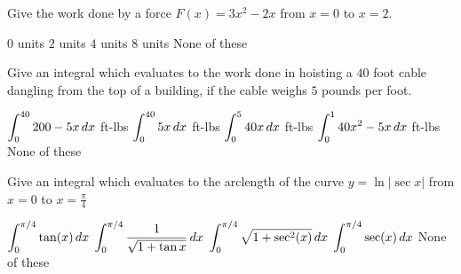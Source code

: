 \documentclass[12pt]{exam}
\newcommand{\ds}{\ensuremath{\displaystyle}}
\begin{document}
\begin{center}
\end{center}
\vspace{0.1in}

\begin{questions}

\setcounter{question}{0}
\question[10]
Give the work done by a force $F(x)=3x^2-2x$ from $x=0$ to $x=2$.

\begin{checkboxes}
\choice $0$ units
\choice $2$ units
\CorrectChoice $4$ units
\choice $8$ units
\choice None of these
\end{checkboxes}

\vfill

\question[10]
Give an integral which evaluates to the work done in hoisting a $40$ foot cable
dangling from the top of a building, if the cable weighs $5$ pounds per foot.


\begin{checkboxes}
\CorrectChoice $\ds\int_0^{40} 200 - 5x\, dx$ ft-lbs
\CorrectChoice $\ds\int_0^{40} 5x\, dx$ ft-lbs
\choice $\ds\int_0^5 40x \, dx$ ft-lbs
\choice $\ds\int_0^1 40x^2-5x\, dx$ ft-lbs
\choice None of these
\end{checkboxes}

\vfill

\question[10]
Give an integral which evaluates to the arclength of the curve $y=\ln|\sec x|$
from $x=0$ to $x=\frac{\pi}{4}$

\begin{checkboxes}
\choice $\ds\int_0^{\pi/4} \tan(x) \, dx$
\choice $\ds\int_0^{\pi/4} \frac{1}{\sqrt{1+\tan x}} \, dx$
\choice $\ds\int_0^{\pi/4} \sqrt{1+\sec^2(x)} \, dx$
\CorrectChoice $\ds\int_0^{\pi/4} \sec(x) \, dx$
\choice None of these
\end{checkboxes}

\vfill

\end{questions}
\end{document}

